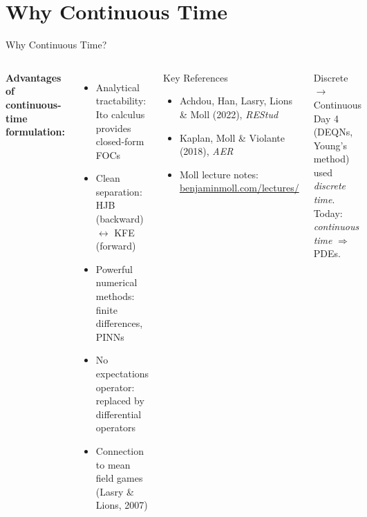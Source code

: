 \documentclass[aspectratio=169,11pt]{beamer}
\newcommand{\emphc}[1]{\textcolor{harvardcrimson}{#1}}
\begin{document}
\section{Why Continuous Time}
\begin{frame}{Why Continuous Time?}
\begin{columns}[T]
\textbf{Advantages of continuous-time formulation:}
\begin{itemize}\itemsep2pt
    \item \emphc{Analytical tractability}: Ito calculus provides closed-form FOCs
    \item \emphc{Clean separation}: HJB (backward) $\leftrightarrow$ KFE (forward)
    \item \emphc{Powerful numerical methods}: finite differences, PINNs
    \item \emphc{No expectations operator}: replaced by differential operators
    \item \emphc{Connection to mean field games} (Lasry \& Lions, 2007)
\end{itemize}

\begin{block}{Key References}
\small
\begin{itemize}\itemsep2pt
    \item Achdou, Han, Lasry, Lions \& Moll (2022), \emph{REStud}
    \item Kaplan, Moll \& Violante (2018), \emph{AER}
    \item Moll lecture notes:\\ \url{benjaminmoll.com/lectures/}
\end{itemize}
\end{block}

\vspace{0.3em}
\begin{alertblock}{\small Discrete $\to$ Continuous}
\small
Day 4 (DEQNs, Young's method) used \emph{discrete time}.\\
Today: \emph{continuous time} $\Rightarrow$ PDEs.
\end{alertblock}
\end{columns}
\end{frame}
\end{document}
